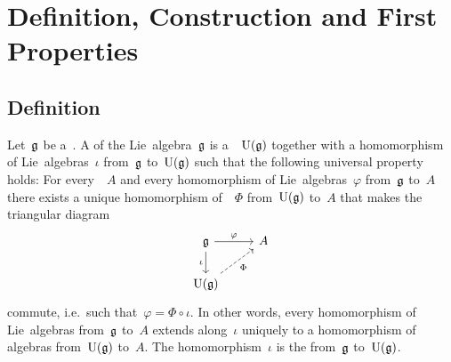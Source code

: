 \section{Definition, Construction and First Properties}





\subsection{Definition}


\begin{definition}
	Let~$\mathfrak{g}$ be a~\liealgebra{$\kf$}.
	A  of the Lie~algebra~$\mathfrak{g}$ is a~\algebra{$\kf$}~$\operatorname{U}(\mathfrak{g})$ together with a homomorphism of Lie~algebras~$\iota$ from~$\mathfrak{g}$ to~$\operatorname{U}(\mathfrak{g})$ such that the following universal property holds:
	For every~{\algebra{$\kf$}}~$A$ and every homomorphism of Lie~algebras~$\varphi$ from~$\mathfrak{g}$ to~$A$ there exists a unique homomorphism of~\algebras{$\kf$}~$\Phi$  from~$\operatorname{U}(\mathfrak{g})$ to~$A$ that makes the triangular diagram
	\[
		\begin{tikzcd}
			\glie
			\arrow{r}[above]{\varphi}
			\arrow{d}[left]{\iota}
			&
			A
			\\
			\Univ(\glie)
			\arrow[dashed]{ur}[below right]{\Phi}
			&
			{}
		\end{tikzcd}
	\]
	commute, i.e.\ such that~$\varphi = \Phi \circ \iota$.
	In other words, every homomorphism of Lie~algebras from~$\mathfrak{g}$ to~$A$ extends along~$\iota$ uniquely to a homomorphism of algebras from~$\operatorname{U}(\mathfrak{g})$ to~$A$.
	The homomorphism~$\iota$ is the  from~$\mathfrak{g}$ to~$\operatorname{U}(\mathfrak{g})$.
\end{definition}


